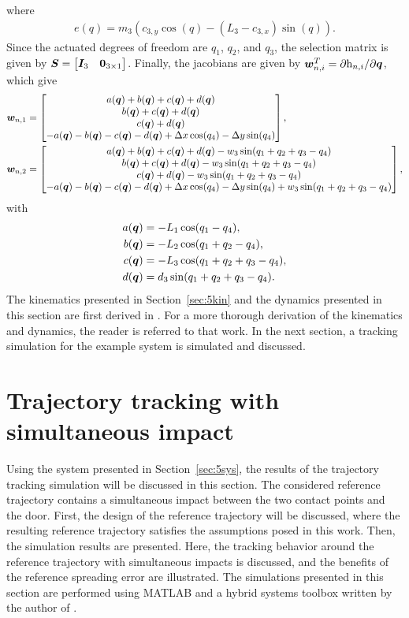 \documentclass[../DC2019003Bouma.tex]{subfiles}
\begin{document}
where
\begin{align*}
e(q) = m_3\left(c_{3,y}\cos(q) - (L_3-c_{3,x})\sin(q)\right).
\end{align*}
Since the actuated degrees of freedom are $q_1$, $q_2$, and $q_3$, the selection matrix is given by ${\boldsymbol{S}} = \begin{bmatrix}{\boldsymbol{I}}_3 & {\boldsymbol{0}}_{3 \times 1}\end{bmatrix}$. Finally, the jacobians are given by ${\boldsymbol{w}}_{n,i}^T = \partial \mathrm{h}_{n,i}/\partial{\boldsymbol{q}}$, which give
\begin{align}
{\boldsymbol{w}}_{n,1} &= \begin{bmatrix}
a({\boldsymbol{q}}) + b({\boldsymbol{q}}) + c({\boldsymbol{q}}) + d({\boldsymbol{q}})\\
b({\boldsymbol{q}}) + c({\boldsymbol{q}}) + d({\boldsymbol{q}})\\
c({\boldsymbol{q}}) + d({\boldsymbol{q}})\\
-a({\boldsymbol{q}}) - b({\boldsymbol{q}}) - c({\boldsymbol{q}}) - d({\boldsymbol{q}}) + \Delta x\cos(q_4) - \Delta y\sin(q_4)
\end{bmatrix},\\
{\boldsymbol{w}}_{n,2} &= \begin{bmatrix}
a({\boldsymbol{q}}) + b({\boldsymbol{q}}) + c({\boldsymbol{q}}) + d({\boldsymbol{q}})-w_3\sin(q_1+q_2+q_3-q_4)\\
b({\boldsymbol{q}}) + c({\boldsymbol{q}}) + d({\boldsymbol{q}})-w_3\sin(q_1+q_2+q_3-q_4)\\
c({\boldsymbol{q}}) + d({\boldsymbol{q}})-w_3\sin(q_1+q_2+q_3-q_4)\\
-a({\boldsymbol{q}}) - b({\boldsymbol{q}}) - c({\boldsymbol{q}}) - d({\boldsymbol{q}}) + \Delta x\cos(q_4) - \Delta y\sin(q_4)+w_3\sin(q_1+q_2+q_3-q_4)
\end{bmatrix},
\end{align}
with
\begin{align*}
a({\boldsymbol{q}}) &= -L_1\cos(q_1-q_4),\\
b({\boldsymbol{q}}) &= -L_2\cos(q_1+q_2-q_4),\\
c({\boldsymbol{q}}) &= -L_3\cos(q_1+q_2+q_3-q_4),\\
d({\boldsymbol{q}}) &= d_3\sin(q_1+q_2+q_3-q_4).
\end{align*}
The kinematics presented in Section~\ref{sec:5kin} and the dynamics presented in this section are first derived in \cite{Rijnen2018b}. For a more thorough derivation of the kinematics and dynamics, the reader is referred to that work. In the next section, a tracking simulation for the example system is simulated and discussed. 
\section{Trajectory tracking with simultaneous impact}\label{sec:5track}
Using the system presented in Section~\ref{sec:5sys}, the results of the trajectory tracking simulation will be discussed in this section. The considered reference trajectory contains a simultaneous impact between the two contact points and the door. First, the design of the reference trajectory will be discussed, where the resulting reference trajectory satisfies the assumptions posed in this work. Then, the simulation results are presented. Here, the tracking behavior around the reference trajectory with simultaneous impacts is discussed, and the benefits of the reference spreading error are illustrated. The simulations presented in this section are performed using MATLAB and a hybrid systems toolbox written by the author of \cite{Rijnen2018a}.
\end{document}

